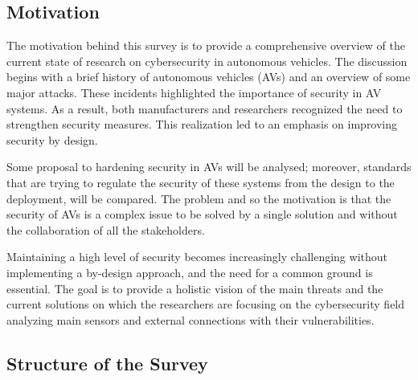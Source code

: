 \subsection{Motivation}\label{subsec:motivation}

The motivation behind this survey is to provide a comprehensive overview of the current state of research on cybersecurity in autonomous vehicles.
The discussion begins with a brief history of autonomous vehicles (AVs) and an overview of some major attacks.
These incidents highlighted the importance of security in AV systems.
As a result, both manufacturers and researchers recognized the need to strengthen security measures.
This realization led to an emphasis on improving security by design.

Some proposal to hardening security in AVs will be analysed; moreover, standards that are trying to regulate the security of these systems from the design to the deployment, will be compared\cite{comparison-standard}.
The problem and so the motivation is that the security of AVs is a complex issue to be solved by a single solution and without the collaboration of all the stakeholders.

Maintaining a high level of security becomes increasingly challenging without implementing a by-design approach, and the need for a common ground is essential.
The goal is to provide a holistic vision of the main threats and the current solutions on which the researchers are focusing on the cybersecurity field
analyzing main sensors and external connections with their vulnerabilities.

\subsection{Structure of the Survey}\label{subsec:structure-of-the-survey}

\newpage
